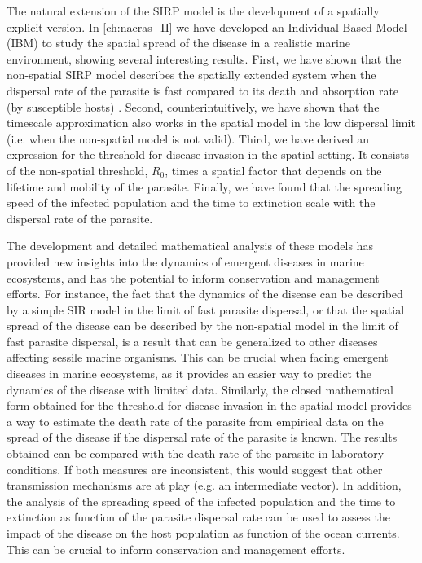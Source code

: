 The natural extension of the SIRP model is the development of a spatially
explicit version. In \cref{ch:nacras_II} we have developed an Individual-Based
Model (IBM) to study the spatial spread of the disease in a realistic marine
environment, showing several interesting results. First, we have shown that the
non-spatial SIRP model describes the spatially extended system when the
dispersal rate of the parasite is fast compared to its death and absorption
rate (by susceptible hosts) \cite{GimenezRomero_2022_RSos}. Second,
counterintuitively, we have shown that the timescale approximation also works
in the spatial model in the low dispersal limit (i.e. when the non-spatial
model is not valid). Third, we have derived an expression for the threshold for
disease invasion in the spatial setting. It consists of the non-spatial
threshold, $R_0$, times a spatial factor that depends on the lifetime and
mobility of the parasite. Finally, we have found that the spreading speed of
the infected population and the time to extinction scale with the dispersal
rate of the parasite.

The development and detailed mathematical analysis of these models has provided
new insights into the dynamics of emergent diseases in marine ecosystems, and
has the potential to inform conservation and management efforts. For instance,
the fact that the dynamics of the disease can be described by a simple SIR
model in the limit of fast parasite dispersal, or that the spatial spread of
the disease can be described by the non-spatial model in the limit of fast
parasite dispersal, is a result that can be generalized to other diseases
affecting sessile marine organisms. This can be crucial when facing emergent
diseases in marine ecosystems, as it provides an easier way to predict the
dynamics of the disease with limited data. Similarly, the closed mathematical
form obtained for the threshold for disease invasion in the spatial model
provides a way to estimate the death rate of the parasite from empirical data
on the spread of the disease if the dispersal rate of the parasite is known.
The results obtained can be compared with the death rate of the parasite in
laboratory conditions. If both measures are inconsistent, this would suggest
that other transmission mechanisms are at play (e.g. an intermediate vector).
In addition, the analysis of the spreading speed of the infected population and
the time to extinction as function of the parasite dispersal rate can be used
to assess the impact of the disease on the host population as function of the
ocean currents. This can be crucial to inform conservation and management
efforts.

